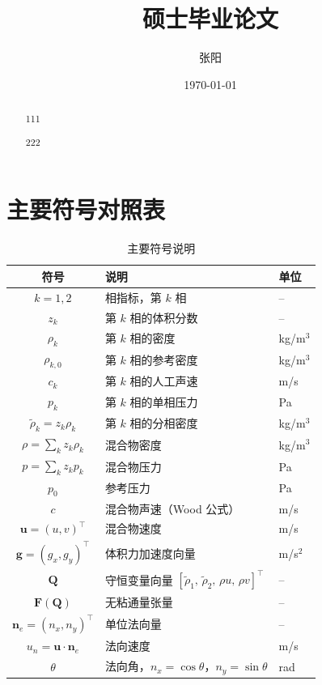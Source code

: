 \documentclass[12pt,a4paper]{article}
\title{硕士毕业论文}
\date{\today}
\author{张阳}
\numberwithin{equation}{section}    %
\begin{document}
\maketitle
\cleardoublepage
\begin{abstract}
    111
\end{abstract}
\begin{abstract}
    222
\end{abstract}
\cleardoublepage
\tableofcontents
\cleardoublepage
\section{主要符号对照表}
\begin{table}[!htbp]
    \centering
    \caption{主要符号说明}
    \label{table:notation}
    \begin{tabular}{cll}
        \toprule
        符号 & 说明 & 单位 \\
        \midrule
        $k = 1, 2$ & 相指标，第 $k$ 相 & -- \\
        $z_k$ & 第 $k$ 相的体积分数 & -- \\
        $\rho_k$ & 第 $k$ 相的密度 & kg/m$^3$ \\
        $\rho_{k,0}$ & 第 $k$ 相的参考密度 & kg/m$^3$ \\
        $c_k$ & 第 $k$ 相的人工声速 & m/s \\
        $p_k$ & 第 $k$ 相的单相压力 & Pa \\
        $\tilde{\rho}_k = z_k\rho_k$ & 第 $k$ 相的分相密度 & kg/m$^3$ \\
        $\rho = \sum_k z_k\rho_k$ & 混合物密度 & kg/m$^3$ \\
        $p = \sum_k z_k p_k$ & 混合物压力 & Pa \\
        $p_0$ & 参考压力 & Pa \\
        $c$ & 混合物声速（Wood 公式） & m/s \\
        $\bm{u} = (u, v)^\top$ & 混合物速度 & m/s \\
        $\bm{g} = (g_x, g_y)^\top$ & 体积力加速度向量 & m/s$^2$ \\
        $\bm{Q}$ & 守恒变量向量
            $[\tilde{\rho}_1,\, \tilde{\rho}_2,\, \rho u,\, \rho v]^\top$ & -- \\
        $\bm{F}(\bm{Q})$ & 无粘通量张量 & -- \\
        $\bm{n}_e = (n_x, n_y)^\top$ & 单位法向量 & -- \\
        $u_n = \bm{u}\cdot\bm{n}_e$ & 法向速度 & m/s \\
        $\theta$ & 法向角，$n_x = \cos\theta$，$n_y = \sin\theta$ & rad \\

\end{tabular}
\end{table}
\end{document}
